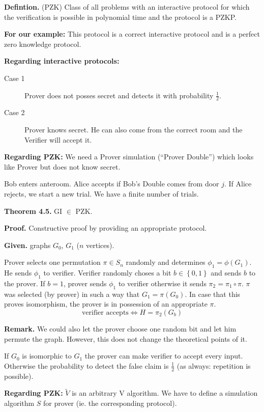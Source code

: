 \documentclass[a4paper]{article}
\newcommand{\cls}[1]{\rm{#1}}
\newcommand{\set}[1]{\left\{#1\right\}}
\begin{document}
\textbf{Defintion.} (\cls{PZK})
\label{class:pzk}
  Class of all problems with an interactive protocol for which
  the verification is possible in polynomial time and the protocol
  is a PZKP.

\textbf{For our example:}
  This protocol is a correct interactive protocol and is a
  perfect zero knowledge protocol.

\textbf{Regarding interactive protocols:}
\begin{description}
  \item[Case 1]
    Prover does not posses secret and detects it with
    probability $\frac12$.
  \item[Case 2]
    Prover knows secret. He can also come from the correct
    room and the Verifier will accept it.
\end{description}

\textbf{Regarding PZK:}
  We need a Prover simulation (``Prover Double'')
  which looks like Prover but does not know secret.

Bob enters anteroom. Alice accepts if Bob's Double comes from
door $j$. If Alice rejects, we start a new trial. We have
a finite number of trials.

\textbf{Theorem 4.5.} \cls{GI} $\in$ PZK.

\textbf{Proof.}
Constructive proof by providing an appropriate protocol.

\textbf{Given.} graphs $G_0$, $G_1$ ($n$ vertices).

Prover selects one permutation $\pi \in S_n$ randomly and determines
$\phi_1 = \phi(G_1)$. He sends $\phi_1$ to verifier. Verifier
randomly choses a bit $b \in \set{0,1}$ and sends $b$ to the prover.
If $b=1$, prover sends $\phi_1$ to verifier otherwise it sends
$\pi_2 = \pi_1 \circ \pi$. $\pi$ was selected (by prover) in such a way
that $G_1 = \pi(G_0)$. In case that this proves isomorphism,
the prover is in possession of an appropriate $\pi$.
\[
  \text{verifier accepts} \Leftrightarrow H = \pi_2(G_b)
\]

\textbf{Remark.} We could also let the prover choose one random bit
and let him permute the graph. However, this does not change the theoretical
points of it.

If $G_0$ is isomorphic to $G_1$ the prover can make verifier to accept
every input. Otherwise the probability to detect the false claim is
$\frac12$ (as always: repetition is possible).

\textbf{Regarding PZK:}
  $\tilde{V}$ is an arbitrary V algorithm. We have to define a simulation
  algorithm $S$ for prover (ie. the corresponding protocol).
\end{document}
